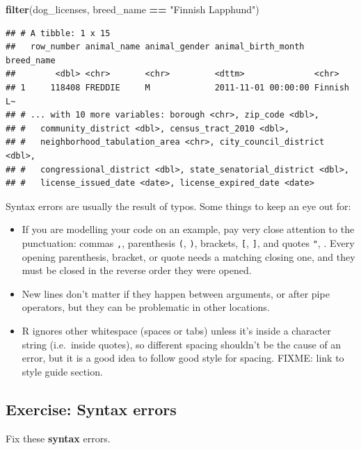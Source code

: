 \documentclass[]{Nemilov}
\newenvironment{Shaded}{\begin{snugshade}}{\end{snugshade}}
\newcommand{\KeywordTok}[1]{\textcolor[rgb]{0.13,0.29,0.53}{\textbf{#1}}}
\newcommand{\NormalTok}[1]{#1}
\newcommand{\OperatorTok}[1]{\textcolor[rgb]{0.81,0.36,0.00}{\textbf{#1}}}
\newcommand{\StringTok}[1]{\textcolor[rgb]{0.31,0.60,0.02}{#1}}
\begin{document}
\begin{Shaded}
\begin{Highlighting}[]
\KeywordTok{filter}\NormalTok{(dog_licenses, breed_name }\OperatorTok{==}\StringTok{ "Finnish Lapphund"}\NormalTok{)}
\end{Highlighting}
\end{Shaded}

\begin{verbatim}
## # A tibble: 1 x 15
##   row_number animal_name animal_gender animal_birth_month  breed_name
##        <dbl> <chr>       <chr>         <dttm>              <chr>     
## 1     118408 FREDDIE     M             2011-11-01 00:00:00 Finnish L~
## # ... with 10 more variables: borough <chr>, zip_code <dbl>,
## #   community_district <dbl>, census_tract_2010 <dbl>,
## #   neighborhood_tabulation_area <chr>, city_council_district <dbl>,
## #   congressional_district <dbl>, state_senatorial_district <dbl>,
## #   license_issued_date <date>, license_expired_date <date>
\end{verbatim}

Syntax errors are usually the result of typos. Some things to keep an eye out for:

\begin{itemize}
\item
  If you are modelling your code on an example, pay very close attention to the punctuation: commas \texttt{,}, parenthesis \texttt{(}, \texttt{)}, brackets, \texttt{{[}}, \texttt{{]}}, and quotes \texttt{"}, \texttt{\textquotesingle{}}. Every opening parenthesis, bracket, or quote needs a matching closing one, and they must be closed in the reverse order they were opened.
\item
  New lines don't matter if they happen between arguments, or after pipe operators, but they can be problematic in other locations.
\item
  R ignores other whitespace (spaces or tabs) unless it's inside a character string (i.e.~inside quotes), so different spacing shouldn't be the cause of an error, but it is a good idea to follow good style for spacing. FIXME: link to style guide section.
\end{itemize}

\hypertarget{exercise-syntax-errors}{%
\subsection{Exercise: Syntax errors}\label{exercise-syntax-errors}}

Fix these \textbf{syntax} errors.
\end{document}
